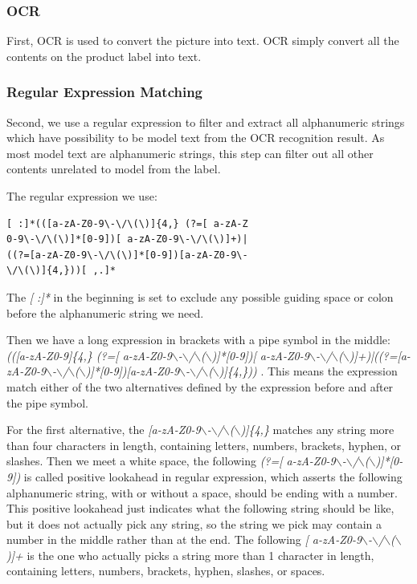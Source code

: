 \documentclass[technicalreport]{ieicej}
\begin{document}
        \subsubsection{OCR}
            First, OCR is used to convert the picture into text. OCR simply convert all the contents on the product label into text.
        

        \subsubsection{Regular Expression Matching}
            Second, we use a regular expression to filter and extract all alphanumeric strings which have possibility to be model text from the OCR recognition result. As most model text are alphanumeric strings, this step can filter out all other contents unrelated to model from the label.

            The regular expression we use:

            \begin{center}
            \begin{BVerbatim}
[ :]*(([a-zA-Z0-9\-\/\(\)]{4,} (?=[ a-zA-Z
0-9\-\/\(\)]*[0-9])[ a-zA-Z0-9\-\/\(\)]+)|
((?=[a-zA-Z0-9\-\/\(\)]*[0-9])[a-zA-Z0-9\-
\/\(\)]{4,}))[ ,.]*
            \end{BVerbatim}
            \end{center}
    
            The {\em [ :]*} in the beginning is set to exclude any possible guiding space or colon before the alphanumeric string we need.

            Then we have a long expression in brackets with a pipe symbol in the middle: {\em (([a-zA-Z0-9\-\/\(\)]\{4,\} (?=[ a-zA-Z0-9$\backslash$-$\backslash$/$\backslash$($\backslash$)]*[0-9])[ a-zA-Z0-9$\backslash$-$\backslash$/$\backslash$($\backslash$)]+)|((?=[a-zA-Z0-9$\backslash$-$\backslash$/$\backslash$($\backslash$)]*[0-9])[a-zA-Z0-9$\backslash$-$\backslash$/$\backslash$($\backslash$)]\{4,\})) }. This means the expression match either of the two alternatives defined by the expression before and after the pipe symbol.

            For the first alternative, the {\em [a-zA-Z0-9$\backslash$-$\backslash$/$\backslash$($\backslash$)]\{4,\}} matches any string more than four characters in length, containing letters, numbers, brackets, hyphen, or slashes. Then we meet a white space, the following {\em (?=[ a-zA-Z0-9$\backslash$-$\backslash$/$\backslash$($\backslash$)]*[0-9])} is called positive lookahead in regular expression, which asserts the following alphanumeric string, with or without a space, should be ending with a number. This positive lookahead just indicates what the following string should be like, but it does not actually pick any string, so the string we pick may contain a number in the middle rather than at the end. The following {\em [ a-zA-Z0-9$\backslash$-$\backslash$/$\backslash$($\backslash$)]+ } is the one who actually picks a string more than 1 character in length, containing letters, numbers, brackets, hyphen, slashes, or spaces.
\end{document}
